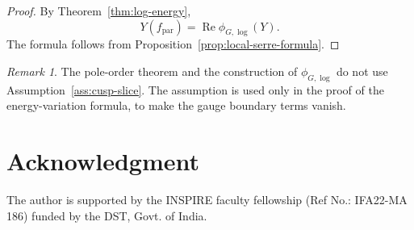 \documentclass[11pt,reqno]{amsart}
\numberwithin{equation}{section}
\theoremstyle{plain}
\theoremstyle{definition}
\theoremstyle{remark}
\newtheorem{remark}[theorem]{Remark}
\begin{document}
\begin{proof}
By Theorem~\ref{thm:log-energy},
\[
        Y(f_{\mathrm{par}})
        =
        \operatorname{Re}\phi_{G,\log}(Y).
\]
The formula follows from Proposition~\ref{prop:local-serre-formula}.
\end{proof}


\begin{remark}
The pole-order theorem and the construction of \(\phi_{G,\log}\) do not use
Assumption~\ref{ass:cusp-slice}. The assumption is used only in the proof of
the energy-variation formula, to make the gauge boundary terms vanish.
\end{remark}

\section*{Acknowledgment}

The author is supported by the INSPIRE faculty fellowship (Ref No.: IFA22-MA 186) funded by the DST, Govt. of India.

\end{document}
